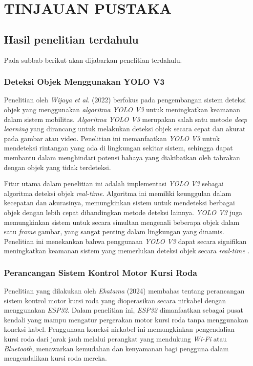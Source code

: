 \chapter{TINJAUAN PUSTAKA}
\label{chap:tinjauanpustaka}

\section{Hasil penelitian terdahulu}
\label{sec:roketluarangkasa}
Pada subbab berikut akan dijabarkan penelitian terdahulu.

\subsection{Deteksi Objek Menggunakan YOLO V3}
\label{subsec:deteksiobjekmenggunakanyolov3}

Penelitian oleh \emph{Wijaya et al.} (2022) berfokus pada pengembangan sistem deteksi objek yang menggunakan \emph{algoritma YOLO V3} untuk meningkatkan keamanan dalam sistem mobilitas. \emph{Algoritma YOLO V3} merupakan salah satu metode \emph{deep learning} yang dirancang untuk melakukan deteksi objek secara cepat dan akurat pada gambar atau video. Penelitian ini memanfaatkan \emph{YOLO V3} untuk mendeteksi rintangan yang ada di lingkungan sekitar sistem, sehingga dapat membantu dalam menghindari potensi bahaya yang diakibatkan oleh tabrakan dengan objek yang tidak terdeteksi.

Fitur utama dalam penelitian ini adalah implementasi \emph{YOLO V3} sebagai algoritma deteksi objek \emph{real-time}. Algoritma ini memiliki keunggulan dalam kecepatan dan akurasinya, memungkinkan sistem untuk mendeteksi berbagai objek dengan lebih cepat dibandingkan metode deteksi lainnya. \emph{YOLO V3} juga memungkinkan sistem untuk secara simultan mengenali beberapa objek dalam satu \emph{frame} gambar, yang sangat penting dalam lingkungan yang dinamis. Penelitian ini menekankan bahwa penggunaan \emph{YOLO V3} dapat secara signifikan meningkatkan keamanan sistem yang memerlukan deteksi objek secara \emph{real-time} \cite{wijaya2022deteksi}.

\subsection{Perancangan Sistem Kontrol Motor Kursi Roda}
\label{subsec:perancangansistemkontrolmotorkursiroda}

Penelitian yang dilakukan oleh \emph{Ekatama} (2024) membahas tentang perancangan sistem kontrol motor kursi roda yang dioperasikan secara nirkabel dengan menggunakan \emph{ESP32}. Dalam penelitian ini, \emph{ESP32} dimanfaatkan sebagai pusat kendali yang mampu mengatur pergerakan motor kursi roda tanpa menggunakan koneksi kabel. Penggunaan koneksi nirkabel ini memungkinkan pengendalian kursi roda dari jarak jauh melalui perangkat yang mendukung \emph{Wi-Fi} atau \emph{Bluetooth}, menawarkan kemudahan dan kenyamanan bagi pengguna dalam mengendalikan kursi roda mereka.

